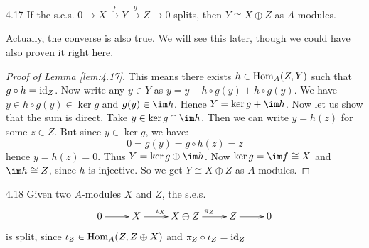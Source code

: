 \documentclass[twoside = false,	%
		headsepline,		%
		parskip = true,
		]{scrbook}						%
\begin{document}
    \begin{lemma}{}{4.17}
        If the s.e.s. $0 \to X \xrightarrow{f} Y \xrightarrow{g} Z \to 0$ splits, then $Y \cong X \oplus Z$ as $A$-modules.
    \end{lemma}
    Actually, the converse is also true. We will see this later, though we could have also proven it right here.
    \begin{proof}[Proof of Lemma \ref{lem:4.17}]
        This means there exists $h \in \mathrm{Hom}_A(Z,Y)$ such that $g \circ h = \mathrm{id}_Z$. Now write any $y \in Y$ as $y = y - h \circ g (y) + h \circ g (y)$. We have $y \in h \circ g (y) \in \ker g$ and $g(y) \in \im h$. Hence $Y = \ker g + \im h$. Now let us show that the sum is direct. Take $y \in \ker g \cap \im h$. Then we can write $y = h(z)$ for some $z \in Z$. But since $y \in \ker g$, we have:
        \begin{equation*}
            0 = g(y) = g \circ h (z) = z
        \end{equation*}
        hence $y = h(z) = 0$. Thus $Y = \ker g \oplus \im h$. Now $\ker g = \im f \cong X$ and $\im h \cong Z$, since $h$ is injective. So we get $Y \cong X \oplus Z$ as $A$-modules.
    \end{proof}

    \begin{example}{}{4.18}
        Given two $A$-modules $X$ and $Z$, the s.e.s.
        \begin{equation*}
            \xymatrix {
                0 \ar[r] & X \ar[r]^{\iota_X} & X \oplus Z \ar[r]^{\pi_Z} & Z \ar[r]& 0
            }
        \end{equation*}
        is split, since $\iota_Z \in \mathrm{Hom}_A(Z,Z \oplus X)$ and $\pi_Z \circ \iota_Z = \mathrm{id}_Z$
    \end{example}
\end{document}
